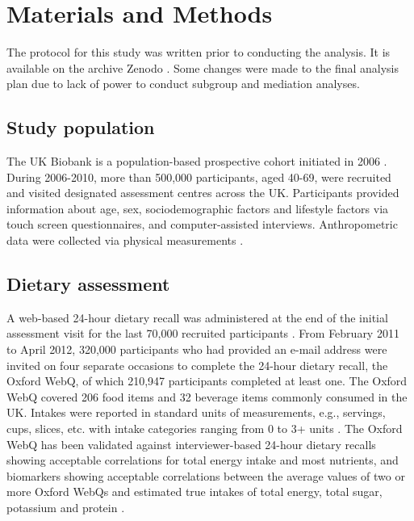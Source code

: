 \documentclass[nutrients,article,submit,moreauthors,pdftex]{Definitions/mdpi}
\begin{document}
\hypertarget{sec2}{%
\section{Materials and Methods}\label{sec2}}

\noindent The protocol for this study was written prior to conducting
the analysis. It is available on the archive Zenodo \citep{protocol}. Some
changes were made to the final analysis plan due to lack of power to
conduct subgroup and mediation analyses.

\hypertarget{subsec1}{%
\subsection{Study population}\label{subsec1}}

The UK Biobank is a population-based prospective cohort initiated in
2006 \citep{sudlow2015}. During 2006-2010, more than 500,000 participants,
aged 40-69, were recruited and visited designated assessment centres
across the UK. Participants provided information about age, sex,
sociodemographic factors and lifestyle factors via touch screen
questionnaires, and computer-assisted interviews. Anthropometric data
were collected via physical measurements \citep{RN113}.

\hypertarget{subsec2}{%
\subsection{Dietary assessment}\label{subsec2}}

A web-based 24-hour dietary recall was administered at the end of the
initial assessment visit for the last 70,000 recruited participants
\citep{RN115}. From February 2011 to April 2012, 320,000 participants who had
provided an e-mail address were invited on four separate occasions to
complete the 24-hour dietary recall, the Oxford WebQ, of which 210,947
participants completed at least one. The Oxford WebQ covered 206 food
items and 32 beverage items commonly consumed in the UK. Intakes were
reported in standard units of measurements, e.g., servings, cups,
slices, etc. with intake categories ranging from 0 to 3+ units
\citep{piernas2021}. The Oxford WebQ has been validated against
interviewer-based 24-hour dietary recalls showing acceptable
correlations for total energy intake and most nutrients, and biomarkers
showing acceptable correlations between the average values of two or
more Oxford WebQs and estimated true intakes of total energy, total
sugar, potassium and protein \citep{Liu2011, Greenwood2019}.
\end{document}
